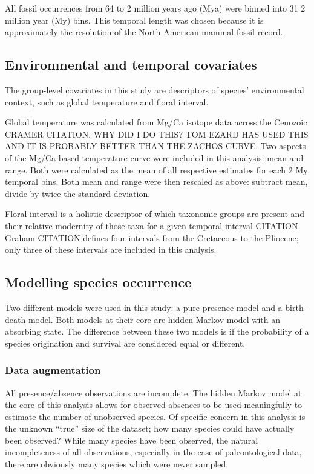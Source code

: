 \documentclass[12pt,letterpaper]{article}
\begin{document}
All fossil occurrences from 64 to 2 million years ago (Mya) were binned into 31 2 million year (My) bins. This temporal length was chosen because it is approximately the resolution of the North American mammal fossil record.



\subsection*{Environmental and temporal covariates}
The group-level covariates in this study are descriptors of species' environmental context, such as global temperature and floral interval. 

Global temperature was calculated from Mg/Ca isotope data across the Cenozoic CRAMER CITATION. \uppercase{why did i do this? tom ezard has used this and it is probably better than the zachos curve.} Two aspects of the Mg/Ca-based temperature curve were included in this analysis: mean and range. Both were calculated as the mean of all respective estimates for each 2 My temporal bins. Both mean and range were then rescaled as above: subtract mean, divide by twice the standard deviation.

Floral interval is a holistic descriptor of which taxonomic groups are present and their relative modernity of those taxa for a given temporal interval CITATION. Graham CITATION defines four intervals from the Cretaceous to the Pliocene; only three of these intervals are included in this analysis.


\subsection*{Modelling species occurrence}
Two different models were used in this study: a pure-presence model and a birth-death model. Both models at their core are hidden Markov model with an absorbing state. The difference between these two models is if the probability of a species origination and survival are considered equal or different. 

\subsubsection*{Data augmentation}
All presence/absence observations are incomplete. The hidden Markov model at the core of this analysis allows for observed absences to be used meaningfully to estimate the number of unobserved species. Of specific concern in this analysis is the unknown ``true'' size of the dataset; how many species could have actually been observed? While many species have been observed, the natural incompleteness of all observations, especially in the case of paleontological data, there are obviously many species which were never sampled.
\end{document}
